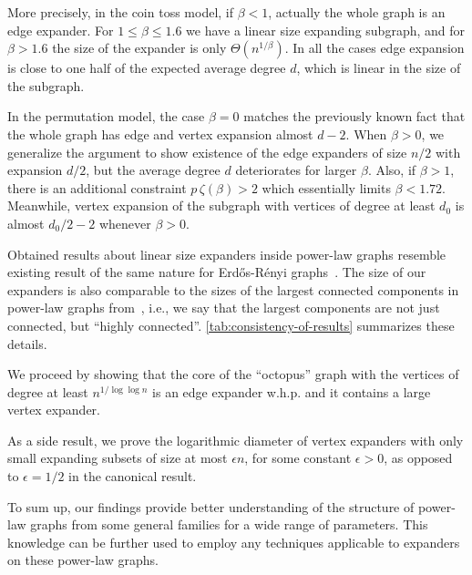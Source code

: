 More precisely, in the coin toss model, if $\beta<1$, actually the whole graph is an edge expander.
For $1\leq\beta\leq 1.6$ we have a linear size expanding subgraph,
and for $\beta>1.6$ the size of the expander is only $\Theta(n^{1/\beta})$.
In all the cases edge expansion is close to one half of the expected average degree $d$,
which is linear in the size of the subgraph.

In the permutation model, the case $\beta=0$ matches the previously known fact
that the whole graph has edge and vertex expansion almost $d-2$.
When $\beta>0$, we generalize the argument to show existence
of the edge expanders of size $n/2$ with expansion $d/2$,
but the average degree $d$ deteriorates for larger $\beta$.
Also, if $\beta>1$, there is an additional constraint $p\,\zeta(\beta)>2$
which essentially limits $\beta<1.72$.
Meanwhile, vertex expansion of the subgraph with vertices of degree
at least $d_0$ is almost $d_0/2-2$ whenever $\beta>0$.

Obtained results about linear size expanders inside power-law graphs
resemble existing result of the same nature for Erd\H{o}s-R\'enyi graphs~\cite{kri17}.
The size of our expanders is also comparable to the sizes of
the largest connected components in power-law graphs from~\cite{acl01}, i.e.,
we say that the largest components are not just connected, but ``highly connected''.
\autoref{tab:consistency-of-results} summarizes these details.

We proceed by showing that the core of the ``octopus'' graph with the vertices
of degree at least $n^{1/\log\log n}$ is an edge expander w.h.p.
and it contains a large vertex expander.

As a side result, we prove the logarithmic diameter of vertex expanders
with only small expanding subsets of size at most $\epsilon n$, for some
constant $\epsilon>0$, as opposed to $\epsilon=1/2$ in the canonical result.

To sum up, our findings provide better understanding of the structure
of power-law graphs from some general families for a wide range of parameters.
This knowledge can be further used to employ any techniques
applicable to expanders on these power-law graphs.

